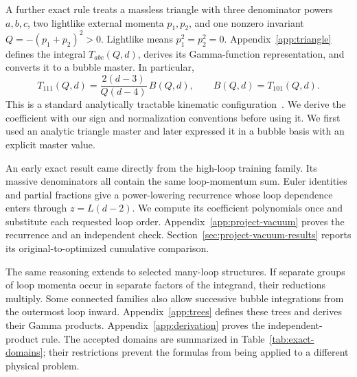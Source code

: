 A further exact rule treats a massless triangle with three denominator powers $a,b,c$, two lightlike external momenta $p_1,p_2$, and one nonzero invariant $Q=-(p_1+p_2)^2>0$. Lightlike means $p_1^2=p_2^2=0$. Appendix~\ref{app:triangle} defines the integral $T_{abc}(Q,d)$, derives its Gamma-function representation, and converts it to a bubble master. In particular,
\begin{equation}
 T_{111}(Q,d)=\frac{2(d-3)}{Q(d-4)}\,B(Q,d),
 \qquad B(Q,d)=T_{101}(Q,d).
 \label{eq:main-triangle}
\end{equation}
This is a standard analytically tractable kinematic configuration~\cite{DavydychevOsland1998}. We derive the coefficient with our sign and normalization conventions before using it. We first used an analytic triangle master and later expressed it in a bubble basis with an explicit master value.

An early exact result came directly from the high-loop training family. Its massive denominators all contain the same loop-momentum sum. Euler identities and partial fractions give a power-lowering recurrence whose loop dependence enters through $z=L(d-2)$. We compute its coefficient polynomials once and substitute each requested loop order. Appendix~\ref{app:project-vacuum} proves the recurrence and an independent check. Section~\ref{sec:project-vacuum-results} reports its original-to-optimized cumulative comparison.

The same reasoning extends to selected many-loop structures. If separate groups of loop momenta occur in separate factors of the integrand, their reductions multiply. Some connected families also allow successive bubble integrations from the outermost loop inward. Appendix~\ref{app:trees} defines these trees and derives their Gamma products. Appendix~\ref{app:derivation} proves the independent-product rule. The accepted domains are summarized in Table~\ref{tab:exact-domains}; their restrictions prevent the formulas from being applied to a different physical problem.


